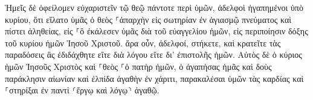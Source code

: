 \documentclass{openreader}
\begin{document}
Ἡμεῖς δὲ ὀφείλομεν εὐχαριστεῖν τῷ θεῷ πάντοτε περὶ ὑμῶν, ἀδελφοὶ ἠγαπημένοι ὑπὸ κυρίου, ὅτι εἵλατο ὑμᾶς ὁ θεὸς ⸀ἀπαρχὴν εἰς σωτηρίαν ἐν ἁγιασμῷ πνεύματος καὶ πίστει ἀληθείας, 
εἰς ⸀ὃ ἐκάλεσεν ὑμᾶς διὰ τοῦ εὐαγγελίου ἡμῶν, εἰς περιποίησιν δόξης τοῦ κυρίου ἡμῶν Ἰησοῦ Χριστοῦ. 
ἄρα οὖν, ἀδελφοί, στήκετε, καὶ κρατεῖτε τὰς παραδόσεις ἃς ἐδιδάχθητε εἴτε διὰ λόγου εἴτε δι’ ἐπιστολῆς ἡμῶν. 
Αὐτὸς δὲ ὁ κύριος ἡμῶν Ἰησοῦς Χριστὸς καὶ ⸀θεὸς ⸀ὁ πατὴρ ἡμῶν, ὁ ἀγαπήσας ἡμᾶς καὶ δοὺς παράκλησιν αἰωνίαν καὶ ἐλπίδα ἀγαθὴν ἐν χάριτι, 
παρακαλέσαι ὑμῶν τὰς καρδίας καὶ ⸀στηρίξαι ἐν παντὶ ⸂ἔργῳ καὶ λόγῳ⸃ ἀγαθῷ. 
\end{document}
